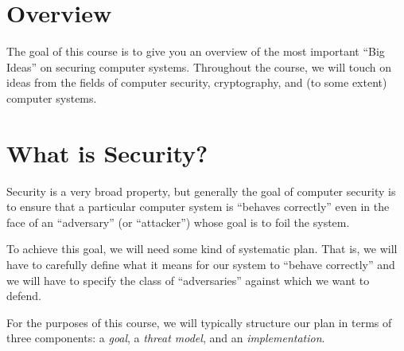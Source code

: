 \section{Overview}


The goal of this course is to give you an overview of the 
most important ``Big Ideas'' on securing computer systems.
Throughout the course, we will touch on ideas from the fields
of computer security, cryptography, and (to some extent)
computer systems.

\iffalse
\textbf{Big Idea}: Big ideas for securing computers.
\begin{itemize}
	\item Lectures: ask questions!
	\item Labs (coding) + psets (theory)
	\item Midterm + final
\end{itemize}
\fi

\section{What is Security?}
Security is a very broad property, but generally
the goal of computer security 
is to ensure that a particular computer system is 
``behaves correctly'' even in the
face of an ``adversary'' (or ``attacker'') whose goal is to foil the
system.

To achieve this goal, we will need some kind of
systematic plan.
That is, we will have to carefully define 
what it means for our system to ``behave correctly''
and we will have to specify the class of 
``adversaries'' against which we want to defend.

For the purposes of this course, we will typically
structure our plan in terms of three components:
a \emph{goal}, 
a \emph{threat model}, and
an \emph{implementation}.

